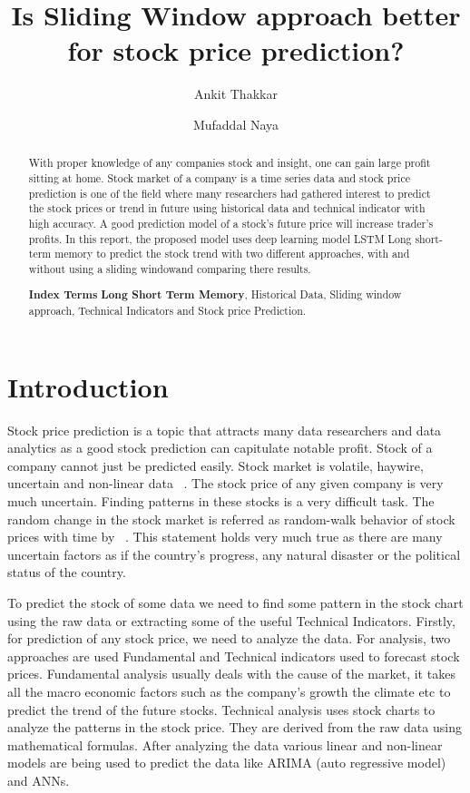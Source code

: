 \documentclass[5p,,preprint,12pt,twocolumn]{elsarticle}
\begin{document}
\begin{frontmatter}
	
\title{Is Sliding Window approach better for stock price prediction?
}
    
\author[]{Ankit Thakkar}
\author[]{Mufaddal Naya}
    

\begin{abstract}
With proper knowledge of any companies stock and insight, one can gain large profit sitting at home. Stock market of a company is a time series data and stock price prediction is one of the field where many researchers had gathered interest to predict the stock prices or trend in future using historical data and technical indicator with high accuracy. A good prediction model of a stock's future price will increase trader's profits. In this report, the proposed model uses deep learning model LSTM {\textemdash} Long short-term memory to predict the stock trend with two different approaches, with and without using a sliding windowand comparing there results.

\textbf{Index Terms}{\textendash} \textbf{Long Short Term Memory}, Historical Data, Sliding window approach, Technical Indicators and Stock price Prediction.
\end{abstract}
\end{frontmatter}
    
\section{Introduction}
Stock price prediction is a topic that attracts many data researchers and data analytics as a good stock prediction can capitulate notable profit. Stock of a company cannot just be predicted easily. Stock market is volatile, haywire, uncertain and non-linear data \unskip~\cite{490201:11043943}. The stock price of any given company is very much uncertain. Finding patterns in these stocks is a very difficult task. The random change in the stock market is referred as random-walk behavior of stock prices with time by \unskip~\cite{490201:11043765}. This statement holds very much true as there are many uncertain factors as if the country's progress, any natural disaster or the political status of the country.

To predict the stock of some data we need to find some pattern in the stock chart using the raw data or extracting some of the useful Technical Indicators. Firstly, for prediction of any stock price, we need to analyze the data. For analysis, two approaches are used Fundamental and Technical indicators used to forecast stock prices. Fundamental analysis usually deals with the cause of the market, it takes all the macro economic factors such as the company's growth the climate etc to predict the trend of the future stocks. Technical analysis uses stock charts to analyze the patterns in the stock price. They are derived from the raw data using mathematical formulas. After analyzing the data various linear and non-linear models are being used to predict the data like ARIMA (auto regressive model) and ANNs. 
\end{document}

